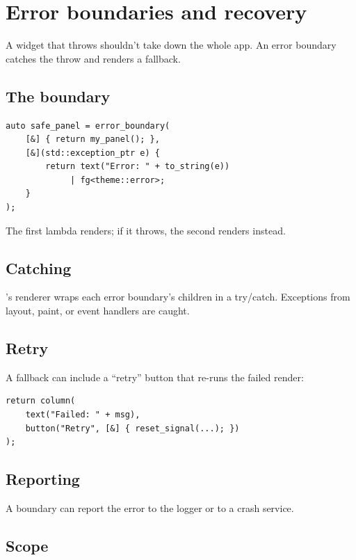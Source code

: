 \chapter{Error boundaries and recovery}
\label{ch:errorboundary2}

\begin{aside}
A widget that throws shouldn't take down the whole app. An
error boundary catches the throw and renders a fallback.
\end{aside}

\section{The boundary}

\begin{lstlisting}
auto safe_panel = error_boundary(
    [&] { return my_panel(); },
    [&](std::exception_ptr e) {
        return text("Error: " + to_string(e))
             | fg<theme::error>;
    }
);
\end{lstlisting}

The first lambda renders; if it throws, the second renders
instead.

\section{Catching}

\maya{}'s renderer wraps each error boundary's children in
a try/catch. Exceptions from layout, paint, or event
handlers are caught.

\section{Retry}

A fallback can include a ``retry'' button that re-runs the
failed render:

\begin{lstlisting}
return column(
    text("Failed: " + msg),
    button("Retry", [&] { reset_signal(...); })
);
\end{lstlisting}

\section{Reporting}

A boundary can report the error to the logger or to a
crash service.

\section{Scope}

